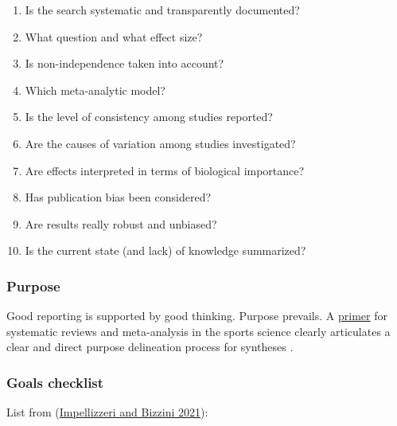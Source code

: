 \documentclass[
]{book}
\providecommand{\tightlist}{%
  \setlength{\itemsep}{0pt}\setlength{\parskip}{0pt}}
\begin{document}
\begin{enumerate}
\def\labelenumi{\arabic{enumi}.}
\tightlist
\item
  Is the search systematic and transparently documented?
\item
  What question and what effect size?\\
\item
  Is non-independence taken into account?\\
\item
  Which meta-analytic model?\\
\item
  Is the level of consistency among studies reported?\\
\item
  Are the causes of variation among studies investigated?\\
\item
  Are effects interpreted in terms of biological importance?\\
\item
  Has publication bias been considered?\\
\item
  Are results really robust and unbiased?\\
\item
  Is the current state (and lack) of knowledge summarized?
\end{enumerate}

\hypertarget{purpose}{%
\subsubsection*{Purpose}\label{purpose}}

Good reporting is supported by good thinking. Purpose prevails. A \href{https://www.ncbi.nlm.nih.gov/pmc/articles/PMC3474302/}{primer} for systematic reviews and meta-analysis in the sports science clearly articulates a clear and direct purpose delineation process for syntheses \citep{RN7298}.

\hypertarget{goals-checklist}{%
\subsubsection*{Goals checklist}\label{goals-checklist}}

List from (\href{https://www.ncbi.nlm.nih.gov/pmc/articles/PMC3474302/}{Impellizzeri and Bizzini 2021}):
\end{document}
